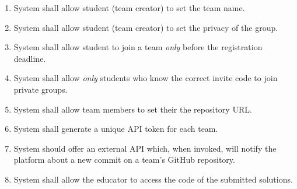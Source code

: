 \begin{enumerate}[label=$\bullet$ \textbf{R\arabic*:}]
    \item System shall allow student (team creator) to set the team name.
    \item System shall allow student (team creator) to set the privacy of the group.
    \item System shall allow student to join a team \textit{only} before the registration deadline.
    \item System shall allow \textit{only} students who know the correct invite code to join private groups.
    \item System shall allow team members to set their the repository URL.
    \item System shall generate a unique API token for each team.
    \item System should offer an external API which, when invoked, will notify the platform about a new commit on a team’s GitHub repository.
    \item System shall allow the educator to access the code of the submitted solutions.
\end{enumerate}
